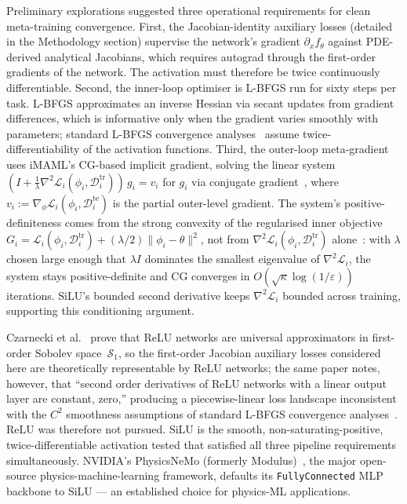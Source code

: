 \documentclass[10pt,journal,compsoc]{IEEEtran}
\begin{document}
Preliminary explorations suggested three operational requirements for clean
meta-training convergence. First, the Jacobian-identity auxiliary losses
(detailed in the Methodology section) supervise the network's gradient
$\partial_x f_\theta$ against PDE-derived analytical Jacobians, which requires
autograd through the first-order gradients of the network. The activation must therefore be
twice continuously differentiable. Second, the inner-loop optimiser is L-BFGS run for sixty steps
per task. L-BFGS approximates an inverse Hessian via secant updates from
gradient differences, which is informative only when the gradient varies
smoothly with parameters; standard L-BFGS convergence
analyses~\cite{liu1989} assume twice-differentiability of the activation
functions. Third, the outer-loop meta-gradient uses iMAML's CG-based implicit
gradient, solving the linear system $(I + \tfrac{1}{\lambda}\nabla^2
\hat{\mathcal{L}}_i(\phi_i, \mathcal{D}^{\text{tr}}_i))\,g_i = v_i$ for $g_i$
via conjugate gradient~\cite{hestenes1952,shewchuk1994},
where $v_i := \nabla_\phi \mathcal{L}_i(\phi_i, \mathcal{D}^{\text{te}}_i)$
is the partial outer-level gradient. The
system's positive-definiteness comes from the strong convexity of the
regularised inner objective $G_i = \mathcal{L}_i(\phi_i,
\mathcal{D}^{\text{tr}}_i) + (\lambda/2)\|\phi_i - \theta\|^2$, not from
$\nabla^2 \mathcal{L}_i(\phi_i, \mathcal{D}^{\text{tr}}_i)$
alone~\cite{rajeswaran2019}: with $\lambda$ chosen large enough that
$\lambda I$ dominates the smallest eigenvalue of $\nabla^2 \mathcal{L}_i$, the
system stays positive-definite and CG converges in
$O(\sqrt{\kappa}\log(1/\varepsilon))$ iterations. SiLU's bounded second
derivative keeps $\nabla^2 \mathcal{L}_i$ bounded across training, supporting
this conditioning argument.

Czarnecki et al.~\cite{czarnecki2017} prove that ReLU networks are
universal approximators in first-order Sobolev space~$\mathcal{S}_1$, so the
first-order Jacobian auxiliary losses considered here are theoretically
representable by ReLU networks; the same paper notes, however, that
``second order derivatives of ReLU networks with a linear output layer are
constant, zero,'' producing a piecewise-linear loss landscape inconsistent
with the $C^2$ smoothness assumptions of standard L-BFGS convergence
analyses~\cite{liu1989}. ReLU was therefore not pursued. SiLU is the
smooth, non-saturating-positive, twice-differentiable activation tested that
satisfied all three pipeline requirements simultaneously. NVIDIA's
PhysicsNeMo (formerly Modulus)~\cite{physicsnemo}, the major open-source
physics-machine-learning framework, defaults its \texttt{FullyConnected} MLP
backbone to SiLU --- an established choice for physics-ML applications.
\end{document}

